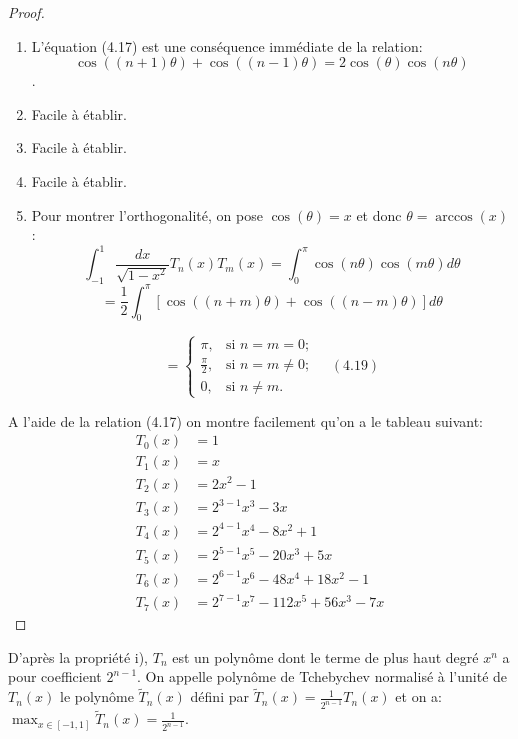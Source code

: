 \begin{proof}
	\begin{enumerate}
		\item L'équation (4.17) est une conséquence immédiate de la relation: $$ \cos((n+1)\theta) + \cos((n-1)\theta) = 2\cos(\theta)\cos(n\theta) $$.
		
		\item Facile à établir.
		
		\item Facile à établir.
		
		\item Facile à établir.
		
		\item Pour montrer l'orthogonalité, on pose $\cos(\theta) = x$ et donc $\theta = \arccos(x)$:
		\[
		\displaystyle\int_{-1}^{1} \frac{dx}{\sqrt{1-x^2}} T_n(x)T_m(x) = \displaystyle\int_{0}^{\pi} \cos(n\theta)\cos(m\theta)d\theta
		\]
		\[
		= \frac{1}{2}\displaystyle\int_{0}^{\pi}[\cos((n+m)\theta) + \cos((n-m)\theta)]d\theta
		\]
		
		\[
		= 
		\left\lbrace \begin{array}{ll}
		\pi, & \text{si } n = m = 0; \\
		\frac{\pi}{2}, & \text{si } n = m \neq 0; \\
		0, & \text{si } n \neq m.
		\end{array} \quad (4.19)\right. 
		\]
	\end{enumerate}
	
	A l'aide de la relation (4.17) on montre facilement qu'on a le tableau suivant: 
	\begin{align*}
	T_0(x) &= 1 \\
	T_1(x) &= x \\
	T_2(x) &= 2x^2-1 \\
	T_3(x) &= 2^{3-1}x^3-3x \\
	T_4(x) &= 2^{4-1}x^4-8x^2+1 \\
	T_5(x) &= 2^{5-1}x^5-20x^3+5x \\
	T_6(x) &= 2^{6-1}x^6-48x^4+18x^2-1 \\
	T_7(x) &= 2^{7-1}x^7-112x^5+56x^3-7x
	\end{align*}
\end{proof}

\begin{remarque}
	D'après la propriété i), $T_n$ est un polynôme dont le terme de plus haut degré $x^n$ a pour coefficient $2^{n-1}$. On appelle polynôme de Tchebychev normalisé à l'unité de $T_n(x)$ le polynôme $\tilde{T}_n(x)$ défini par $\tilde{T}_n(x) = \frac{1}{2^{n-1}} T_n(x)$ et on a: $\max_{x \in [-1,1]} \tilde{T}_n(x) = \frac{1}{2^{n-1}}$.
\end{remarque}

